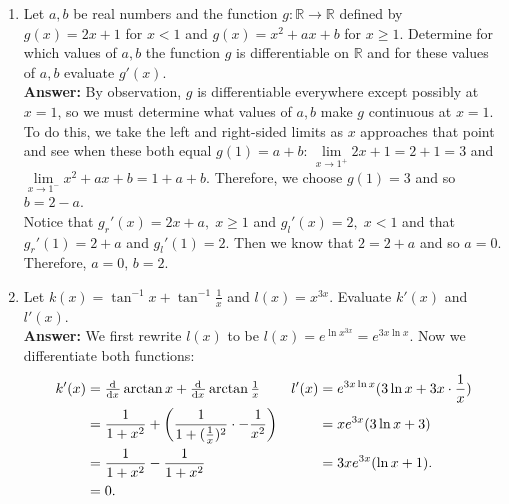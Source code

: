 \documentclass{article}
\begin{document}
\begin{enumerate}
        \item Let $a,b$ be real numbers and the function $g : \mathbb{R} \to \mathbb{R}$ defined by $g(x) = 2x+1$ for $x < 1$ and $g(x) = x^2+ax+b$ for $x \geq 1$. Determine for which values of $a,b$ the function $g$ is differentiable on $\mathbb{R}$ and for these values of $a,b$ evaluate $g'(x)$.\\
        \textbf{Answer: }By observation, $g$ is differentiable everywhere except possibly at $x=1$, so we must determine what values of $a,b$ make $g$ continuous at $x=1$. To do this, we take the left and right-sided limits as $x$ approaches that point and see when these both equal $g(1) = a+b$: $\lim\limits_{ x \to 1^+}2x+1 = 2+1 = 3$ and $\lim\limits_{x \to 1^-}x^2+ax+b = 1+a+b$. Therefore, we choose $g(1) = 3$ and so $b=2-a$.\\
        Notice that $g_r'(x) = 2x+a, \; x \geq 1$ and $g_l'(x) = 2, \; x < 1$ and that $g_r'(1) = 2+a$ and $g_l'(1) = 2$. Then we know that $2 = 2+a$ and so $a=0$. Therefore, $a=0,\,b=2$.\\
        
        \item Let $k(x) = \tan^{-1}x+\tan^{-1}\frac{1}{x}$ and $l(x) = x^{3x}$. Evaluate $k'(x)$ and $l'(x)$.\\
        \textbf{Answer: }We first rewrite $l(x)$ to be $l(x) = e^{\ln{x^{3x}}} = e^{3x\ln{x}}$. Now we differentiate both functions:
        \begin{align*}
            k'(x) &= \od{}{x}\arctan{x} + \od{}{x}\arctan{\tfrac{1}{x}}  &   l'(x) &= e^{3x\ln{x}}(3\ln{x}+3x \cdot \frac{1}{x})\\
            &= \frac{1}{1+x^2}+\bigg(\frac{1}{1+(\frac{1}{x})^2} \cdot -\frac{1}{x^2}\bigg)   &   &= xe^{3x}(3\ln{x}+3)\\
            &= \frac{1}{1+x^2}-\frac{1}{1+x^2} &   &= 3xe^{3x}(\ln{x}+1).\\
            &= 0.
        \end{align*}
    \end{enumerate}
\end{document}
